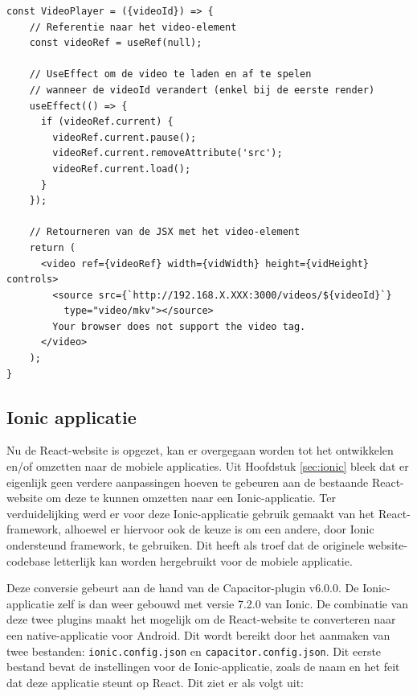 \begin{mdframed}[backgroundcolor=bg]
  \begin{verbatim}
const VideoPlayer = ({videoId}) => {
    // Referentie naar het video-element
    const videoRef = useRef(null);

    // UseEffect om de video te laden en af te spelen
    // wanneer de videoId verandert (enkel bij de eerste render)
    useEffect(() => {
      if (videoRef.current) {
        videoRef.current.pause();
        videoRef.current.removeAttribute('src');
        videoRef.current.load();
      }
    });

    // Retourneren van de JSX met het video-element
    return (
      <video ref={videoRef} width={vidWidth} height={vidHeight} controls>
        <source src={`http://192.168.X.XXX:3000/videos/${videoId}`}
          type="video/mkv"></source>
        Your browser does not support the video tag.
      </video>
    );
}
  \end{verbatim}
\end{mdframed}


\subsection{Ionic applicatie}
\label{sec:ionic-applicatie}

Nu de React-website is opgezet, kan er overgegaan worden tot het ontwikkelen en/of omzetten naar de mobiele applicaties. Uit Hoofdstuk \ref{sec:ionic} bleek dat er eigenlijk geen verdere aanpassingen hoeven te gebeuren aan de bestaande React-website om deze te kunnen omzetten naar een Ionic-applicatie. Ter verduidelijking werd er voor deze Ionic-applicatie gebruik gemaakt van het React-framework, alhoewel er hiervoor ook de keuze is om een andere, door Ionic ondersteund framework, te gebruiken. Dit heeft als troef dat de originele website-codebase letterlijk kan worden hergebruikt voor de mobiele applicatie.

Deze conversie gebeurt aan de hand van de Capacitor-plugin v6.0.0. De Ionic-applicatie zelf is dan weer gebouwd met versie 7.2.0 van Ionic. De combinatie van deze twee plugins maakt het mogelijk om de React-website te converteren naar een native-applicatie voor Android. Dit wordt bereikt door het aanmaken van twee bestanden: \verb|ionic.config.json| en \verb|capacitor.config.json|. Dit eerste bestand bevat de instellingen voor de Ionic-applicatie, zoals de naam en het feit dat deze applicatie steunt op React. Dit ziet er als volgt uit:

